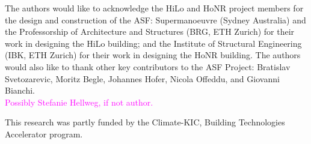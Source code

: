 
The authors would like to acknowledge the HiLo and HoNR project members for the design and construction of the ASF: Supermanoeuvre (Sydney Australia) and the Professorship of Architecture and Structures (BRG, ETH Zurich) for their work in designing the HiLo building; and the Institute of Structural Engineering (IBK, ETH Zurich) for their work in designing the HoNR building. The authors would also like to thank other key contributors to the ASF Project: Bratislav Svetozarevic, Moritz Begle, Johannes Hofer, Nicola Offeddu, and Giovanni Bianchi. \\
\textcolor{magenta}{Possibly Stefanie Hellweg, if not author.}

This research was partly funded by the Climate-KIC, Building Technologies Accelerator program.
